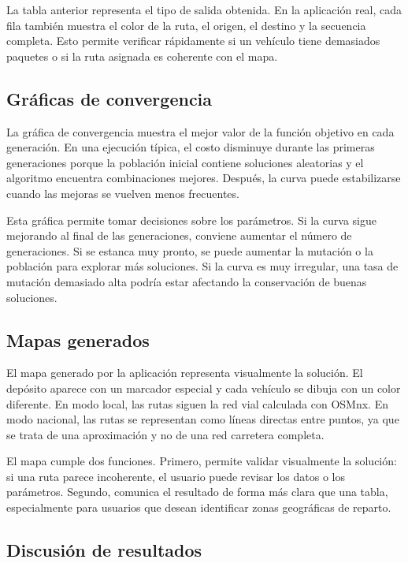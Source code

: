\documentclass[runningheads]{llncs}
\begin{document}
La tabla anterior representa el tipo de salida obtenida. En la aplicaci\'on real,
cada fila tambi\'en muestra el color de la ruta, el origen, el destino y la
secuencia completa. Esto permite verificar r\'apidamente si un veh\'iculo tiene
demasiados paquetes o si la ruta asignada es coherente con el mapa.

\subsection{Gr\'aficas de convergencia}

La gr\'afica de convergencia muestra el mejor valor de la funci\'on objetivo en
cada generaci\'on. En una ejecuci\'on t\'ipica, el costo disminuye durante las
primeras generaciones porque la poblaci\'on inicial contiene soluciones
aleatorias y el algoritmo encuentra combinaciones mejores. Despu\'es, la curva
puede estabilizarse cuando las mejoras se vuelven menos frecuentes.

Esta gr\'afica permite tomar decisiones sobre los par\'ametros. Si la curva sigue
mejorando al final de las generaciones, conviene aumentar el n\'umero de
generaciones. Si se estanca muy pronto, se puede aumentar la mutaci\'on o la
poblaci\'on para explorar m\'as soluciones. Si la curva es muy irregular, una tasa
de mutaci\'on demasiado alta podr\'ia estar afectando la conservaci\'on de buenas
soluciones.

\subsection{Mapas generados}

El mapa generado por la aplicaci\'on representa visualmente la soluci\'on. El
dep\'osito aparece con un marcador especial y cada veh\'iculo se dibuja con un
color diferente. En modo local, las rutas siguen la red vial calculada con
OSMnx. En modo nacional, las rutas se representan como l\'ineas directas entre
puntos, ya que se trata de una aproximaci\'on y no de una red carretera completa.

El mapa cumple dos funciones. Primero, permite validar visualmente la soluci\'on:
si una ruta parece incoherente, el usuario puede revisar los datos o los
par\'ametros. Segundo, comunica el resultado de forma m\'as clara que una tabla,
especialmente para usuarios que desean identificar zonas geogr\'aficas de reparto.

\subsection{Discusi\'on de resultados}
\end{document}
